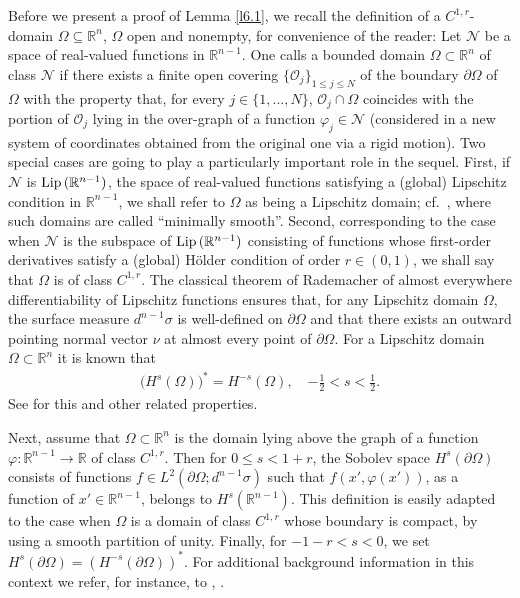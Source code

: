 \documentclass[reqno,10pt, centertags]{amsart}
\newcommand{\bbR}{{\mathbb{R}}}
\newcommand{\lb}{\label}
\newcommand{\Om}{\Omega}
\numberwithin{equation}{section}
\theoremstyle{definition}
\begin{document}
Before we present a proof of Lemma \ref{l6.1}, we recall the
definition of a $C^{1,r}$-domain $\Omega\subseteq\bbR^n$, $\Om$ open and
nonempty, for convenience of the reader: Let ${\mathcal N}$ be a space of
real-valued functions in $\bbR^{n-1}$.  One calls a bounded domain
$\Omega\subset\bbR^n$ of class ${\mathcal N}$ if there exists a finite
open covering $\{{\mathcal O}_j\}_{1\leq j\leq N}$ of the boundary
$\partial\Omega$ of $\Om$ with the property that, for every
$j\in\{1,...,N\}$, ${\mathcal O}_j\cap\Omega$ coincides with the portion of
${\mathcal O}_j$ lying in the over-graph of a function
$\varphi_j\in{\mathcal N}$ (considered in a new system
of coordinates obtained from the original one via a rigid motion). Two
special cases are going to play a particularly important role in the
sequel. First, if ${\mathcal  N}$ is ${\rm Lip}\,(\bbR^{n-1})$,
the space of real-valued functions satisfying a (global) Lipschitz
condition in $\bbR^{n-1}$, we shall refer to $\Omega$ as being a Lipschitz
domain; cf.\ \cite[p.\ 189]{St70}, where such domains are called
``minimally smooth''. Second, corresponding to  the case when
${\mathcal N}$ is the subspace of ${\rm Lip}\,(\bbR^{n-1})$ consisting of
functions whose first-order derivatives satisfy a (global) H\"older
condition of order $r\in(0,1)$, we shall say that $\Omega$ is of class
$C^{1,r}$. The classical theorem of  Rademacher of almost everywhere
differentiability of Lipschitz functions ensures that, for any  Lipschitz
domain $\Omega$, the surface measure
$d^{n-1}\sigma$ is well-defined on  $\partial\Omega$ and that there exists an
outward  pointing normal vector $\nu$ at almost every point of
$\partial\Omega$. For a Lipschitz domain $\Omega\subset\bbR^n$ it is
known that
\begin{align}\lb{dual-xxx}
\bigl(H^{s}(\Omega)\bigr)^*=H^{-s}(\Omega), \quad
{\textstyle{-\frac12}}<s<{\textstyle{\frac12}}.
\end{align}
See \cite{Tr02} for this and other related properties.

Next, assume that $\Omega\subset\bbR^n$ is the domain lying above the
graph of a function $\varphi:\bbR^{n-1}\to\bbR$ of class $C^{1,r}$.
Then for $0\leq s<1+r$, the Sobolev space $H^s(\partial\Omega)$ consists
of functions $f\in L^2(\partial\Omega;d^{n-1}\sigma)$ such that
$f(x',\varphi(x'))$, as a function of $x'\in\bbR^{n-1}$, belongs
to $H^s(\bbR^{n-1})$. This definition is easily adapted to the
case when $\Omega$ is a domain of class $C^{1,r}$ whose boundary is compact,
by using a smooth partition of unity. Finally, for $-1-r<s<0$, we set
$H^s(\partial\Omega)=(H^{-s}(\partial\Omega))^*$. For additional
background information in this context we refer, for instance, to
\cite[Ch.\ 3]{Mc00}, \cite[Sect.\ I.4.2]{Wl87}.
\end{document}
